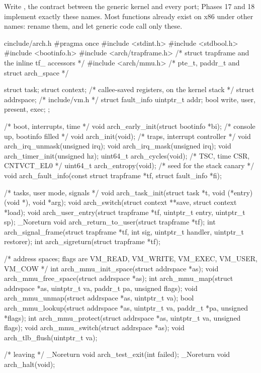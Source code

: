 \documentclass[11pt,a4paper]{article}
\begin{document}
Write , the contract between the generic kernel and every port; Phases 17 and 18 implement
exactly these names. Most functions already exist on x86 under other names: rename them, and let generic code call
only these.

\begin{lst}{c}{include/arch.h}
#pragma once
#include <stdint.h>
#include <stdbool.h>
#include <bootinfo.h>
#include <arch/trapframe.h>    /* struct trapframe and the inline tf_ accessors */
#include <arch/mmu.h>          /* pte_t, paddr_t and struct arch_space          */

struct task;
struct context;                /* callee-saved registers, on the kernel stack */
struct addrspace;              /* include/vm.h                                 */
struct fault_info { uintptr_t addr; bool write, user, present, exec; };

/* boot, interrupts, time */
void     arch_early_init(struct bootinfo *bi);   /* console up, bootinfo filled */
void     arch_init(void);                        /* traps, interrupt controller  */
void     arch_irq_unmask(unsigned irq);
void     arch_irq_mask(unsigned irq);
void     arch_timer_init(unsigned hz);
uint64_t arch_cycles(void);                      /* TSC, time CSR, CNTVCT_EL0    */
uint64_t arch_entropy(void);                     /* seed for the stack canary    */
void     arch_fault_info(const struct trapframe *tf, struct fault_info *fi);

/* tasks, user mode, signals */
void     arch_task_init(struct task *t, void (*entry)(void *), void *arg);
void     arch_switch(struct context **save, struct context *load);
void     arch_user_entry(struct trapframe *tf, uintptr_t entry, uintptr_t sp);
_Noreturn void arch_return_to_user(struct trapframe *tf);
int      arch_signal_frame(struct trapframe *tf, int sig, uintptr_t handler, uintptr_t restorer);
int      arch_sigreturn(struct trapframe *tf);

/* address spaces; flags are VM_READ, VM_WRITE, VM_EXEC, VM_USER, VM_COW */
int      arch_mmu_init_space(struct addrspace *as);
void     arch_mmu_free_space(struct addrspace *as);
int      arch_mmu_map(struct addrspace *as, uintptr_t va, paddr_t pa, unsigned flags);
void     arch_mmu_unmap(struct addrspace *as, uintptr_t va);
bool     arch_mmu_lookup(struct addrspace *as, uintptr_t va, paddr_t *pa, unsigned *flags);
int      arch_mmu_protect(struct addrspace *as, uintptr_t va, unsigned flags);
void     arch_mmu_switch(struct addrspace *as);
void     arch_tlb_flush(uintptr_t va);

/* leaving */
_Noreturn void arch_test_exit(int failed);
_Noreturn void arch_halt(void);
\end{lst}
\end{document}
